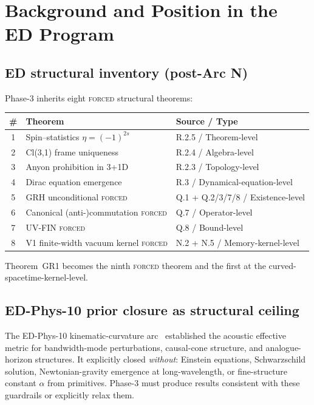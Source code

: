 \documentclass[11pt,a4paper]{article}
\begin{document}
\section{Background and Position in the ED Program}

\subsection{ED structural inventory (post-Arc N)}

Phase-3 inherits eight \textsc{forced} structural theorems:
\begin{center}
\begin{tabular}{cll}
\hline
\# & Theorem & Source / Type \\
\hline
1 & Spin--statistics $\eta = (-1)^{2s}$ & R.2.5 / Theorem-level \\
2 & Cl(3,1) frame uniqueness & R.2.4 / Algebra-level \\
3 & Anyon prohibition in 3+1D & R.2.3 / Topology-level \\
4 & Dirac equation emergence & R.3 / Dynamical-equation-level \\
5 & GRH unconditional \textsc{forced} & Q.1 + Q.2/3/7/8 / Existence-level \\
6 & Canonical (anti-)commutation \textsc{forced} & Q.7 / Operator-level \\
7 & UV-FIN \textsc{forced} & Q.8 / Bound-level \\
8 & V1 finite-width vacuum kernel \textsc{forced} & N.2 + N.5 / Memory-kernel-level \\
\hline
\end{tabular}
\end{center}

Theorem~GR1 becomes the ninth \textsc{forced} theorem and the first at the curved-spacetime-kernel-level.

\subsection{ED-Phys-10 prior closure as structural ceiling}

The ED-Phys-10 kinematic-curvature arc~\cite{edphys10} established the acoustic effective metric for bandwidth-mode perturbations, causal-cone structure, and analogue-horizon structures. It explicitly closed \emph{without}: Einstein equations, Schwarzschild solution, Newtonian-gravity emergence at long-wavelength, or fine-structure constant $\alpha$ from primitives. Phase-3 must produce results consistent with these guardrails or explicitly relax them.
\end{document}
